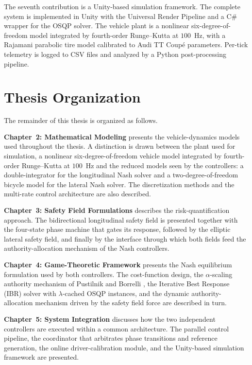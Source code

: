 \documentclass[12pt,a4paper,oneside]{report}
\begin{document}
The seventh contribution is a Unity-based simulation framework. The complete system
is implemented in Unity with the Universal Render Pipeline and a C\#
wrapper for the OSQP solver. The vehicle plant is a nonlinear six-degree-of-freedom
model \cite{belousovDevelopmentVehicleSimulation} integrated by fourth-order Runge--Kutta at $100$\, Hz, with a Rajamani parabolic tire model calibrated to Audi TT Coup\'{e} parameters.
Per-tick telemetry is logged to CSV files and analyzed by a Python post-processing
pipeline.

\section{Thesis Organization}

The remainder of this thesis is organized as follows.

\textbf{Chapter~2: Mathematical Modeling} presents the vehicle-dynamics models used
throughout the thesis. A distinction is drawn between the plant used for simulation, 
a nonlinear six-degree-of-freedom vehicle model integrated by fourth-order
Runge--Kutta at $100$\, Hz  and the reduced models seen by the controllers: a
double-integrator for the longitudinal Nash solver and a two-degree-of-freedom
bicycle model for the lateral Nash solver. The discretization methods and the
multi-rate control architecture are also described.

\textbf{Chapter~3: Safety Field Formulations} describes the risk-quantification
approach. The bidirectional longitudinal safety field is presented together with
the four-state phase machine that gates its response, followed by the elliptic
lateral safety field, and finally by the interface through which both fields feed
the authority-allocation mechanism of the Nash controllers.

\textbf{Chapter~4: Game-Theoretic Framework} presents the Nash equilibrium
formulation used by both controllers. The cost-function design, the
$\alpha$-scaling authority mechanism of Pustilnik and Borrelli
\cite{pustilnikGeneralizedNashEquilibrium2025}, the Iterative Best Response (IBR) solver with
$\lambda$-cached OSQP instances, and the dynamic authority-allocation mechanism
driven by the safety field force are described in turn.

\textbf{Chapter~5: System Integration} discusses how the two independent controllers
are executed within a common architecture. The parallel control pipeline, the
coordinator that arbitrates phase transitions and reference generation, the online
driver-calibration module, and the Unity-based simulation framework are presented.
\end{document}
